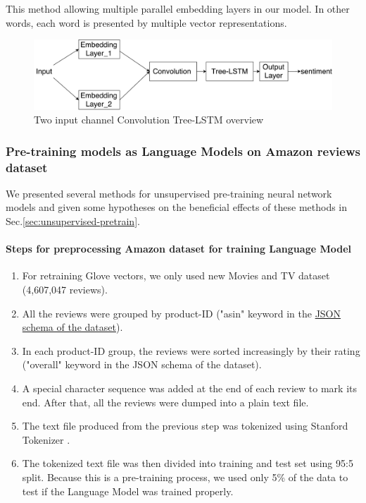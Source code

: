 This method allowing multiple parallel embedding layers in our model. 
In other words, each word is presented by multiple vector representations. 

\begin{figure}[H]
    \centering
    \includegraphics[width=0.8\linewidth]{figure/multichannelcnnlstm}
    \caption[Convolution Tree-LSTM overview]{Two input channel Convolution Tree-LSTM overview}
    \label{fig:multichannelcnnlstm}
\end{figure}


\subsubsection{Pre-training models as Language Models on Amazon reviews dataset}
We presented several methods for unsupervised pre-training neural network models and given some hypotheses on the beneficial effects of these methods in Sec.\ref{sec:unsupervised-pretrain}.
\paragraph{Steps for preprocessing Amazon dataset for training Language Model}
\label{sec:preprocessamazonglove-LM}
\begin{enumerate}
\item For retraining Glove vectors, we only used new Movies and TV dataset (4,607,047 reviews)\cite{McAuleyTSH15}\cite{HeM16}.
\item All the reviews were grouped by product-ID ("asin" keyword in the \hyperref[sec:amazon]{JSON schema of the dataset}). 
\item In each product-ID group, the reviews were sorted increasingly by their rating ("overall" keyword in the JSON schema of the dataset).
\item A special character sequence was added at the end of each review to mark its end.
After that, all the reviews were dumped into a plain text file.
\item The text file produced from the previous step was tokenized using Stanford Tokenizer \cite{tokenizerpart}. 
\item The tokenized text file was then divided into training and test set using 95:5 split.
Because this is a pre-training process, we used only 5\% of the data to test if the Language Model was trained properly.
\end{enumerate}

